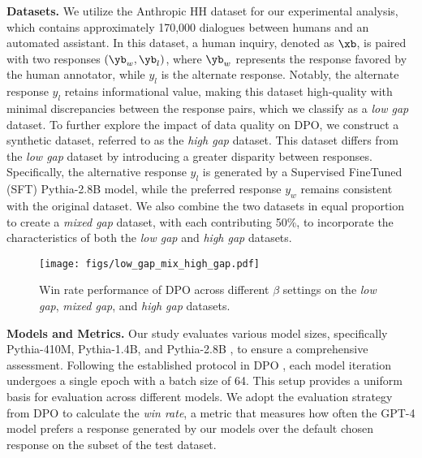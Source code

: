 \textbf{Datasets.} 
We utilize the Anthropic HH dataset \cite{Bai2022training} for our experimental analysis, which contains approximately 170,000 dialogues between humans and an automated assistant. In this dataset, a human inquiry, denoted as $\xb$, is paired with two responses $(\yb_w, \yb_l)$, where $\yb_w$ represents the response favored by the human annotator, while $y_l$ is the alternate response. Notably, the alternate response $y_l$ retains informational value, making this dataset high-quality with minimal discrepancies between the response pairs, which we classify as a \emph{low gap} dataset.
To further explore the impact of data quality on DPO, we construct a synthetic dataset, referred to as the \emph{high gap} dataset. This dataset differs from the \emph{low gap} dataset by introducing a greater disparity between responses. Specifically, the alternative response $y_l$ is generated by a Supervised FineTuned (SFT) Pythia-2.8B model, while the preferred response $y_w$ remains consistent with the original dataset.
We also combine the two datasets in equal proportion to create a \emph{mixed gap} dataset, with each contributing 50\%, to incorporate the characteristics of both the \emph{low gap} and \emph{high gap} datasets.

 \begin{figure}[t]
    \vspace{-10pt}
    \centering
    \texttt{[image: figs/low\_gap\_mix\_high\_gap.pdf]}
    \caption{Win rate performance of DPO across different $\beta$ settings on the \emph{low gap}, \emph{mixed gap}, and \emph{high gap} datasets.}
    \label{fig_low_high_gap}
    \vspace{-10pt}
 \end{figure}
 
\textbf{Models and Metrics.} 
Our study evaluates various model sizes, specifically Pythia-410M, Pythia-1.4B, and Pythia-2.8B \cite{pythia}, to ensure a comprehensive assessment. Following the established protocol in DPO \cite{DPO}, each model iteration undergoes a single epoch with a batch size of 64. This setup provides a uniform basis for evaluation across different models.
We adopt the evaluation strategy from DPO \cite{DPO} to calculate the \textit{win rate}, a metric that measures how often the GPT-4 model prefers a response generated by our models over the default chosen response on the subset of the test dataset.

